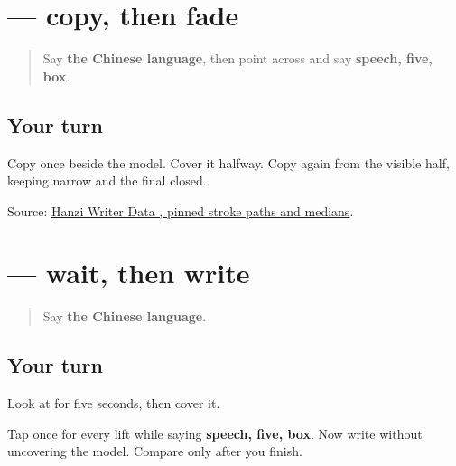 \section[\texorpdfstring{\zh{语} (yǔ)}{语 (yǔ)}]{ — copy, then fade}

\label{lesson:ZH-W16-yu-guided}



\begin{quote}
Say \textbf{the Chinese language}, then point across \textbf{} and say \textbf{speech, five, box}.
\end{quote}

\subsection*{Your turn}

Copy \textbf{} once beside the model. Cover it halfway. Copy again from the visible half, keeping  narrow and the final  closed.

\begin{tcolorbox}[breakable,colback=teal!4,colframe=teal!35!black,title={Before you move on}]
Source: \href{https://raw.githubusercontent.com/chanind/hanzi-writer-data/68d10a4b21150cae5e1ebbd223eed289cf32d90c/data/\%E8\%AF\%AD.json}{Hanzi Writer Data , pinned stroke paths and medians}.
\end{tcolorbox}
\section[\texorpdfstring{\zh{语} (yǔ)}{语 (yǔ)}]{ — wait, then write}

\label{lesson:ZH-W16-yu-delayed}



\begin{quote}
Say \textbf{the Chinese language}.
\end{quote}

\subsection*{Your turn}

Look at \textbf{} for five seconds, then cover it.

Tap once for every lift while saying \textbf{speech, five, box}. Now write \textbf{} without uncovering the model. Compare only after you finish.


